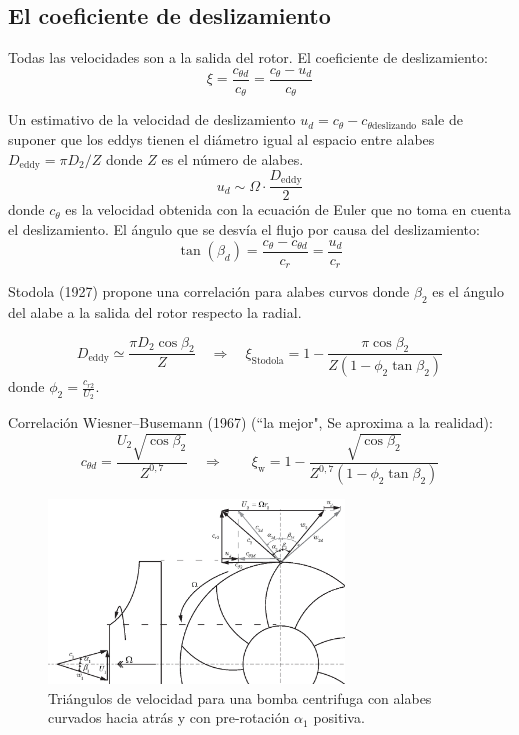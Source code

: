 \documentclass{article}
\newcommand{\ctan}[1]{\ensuremath{c_{\theta #1}}}
\newcommand{\crad}[1]{\ensuremath{c_{r #1}}}
\newcommand{\slip}{\xi}
\begin{document}
\subsection{El coeficiente de deslizamiento}
Todas las velocidades son a la salida del rotor. El coeficiente de deslizamiento:
\[
\slip = \frac{\ctan{d}}{\ctan{}} = \frac{\ctan{}-u_d}{\ctan{}}
\]

Un estimativo de la velocidad de deslizamiento $u_d= \ctan{}-\ctan{\mathrm{deslizando}}$ sale de suponer que los eddys tienen el diámetro igual al espacio entre alabes $D_{\mathrm{eddy}}= \pi D_{\mathrm{2}}/Z$ donde $Z$ es el número de alabes. 
\[
u_d \sim \Omega \cdot \frac{D_{\mathrm{eddy}}}{2}
\]
donde $\ctan{}$ es la velocidad obtenida con la ecuación de Euler que no toma en cuenta el deslizamiento. El ángulo que se desvía el flujo por causa del deslizamiento:
\[
\tan (\beta_d) =\frac{\ctan{}-\ctan{d}}{\crad{}}= \frac{u_d}{\crad{}}
\]

Stodola (1927) propone una correlación para alabes curvos donde $\beta_2$ es el ángulo del alabe a la salida del rotor respecto la radial.

\[
D_{\mathrm{eddy}}\simeq \frac{\pi D_2\cos \beta_2}{Z} \quad\Rightarrow \quad \slip_{\mathrm{Stodola}} = 1-\frac{\pi \cos \beta_2}{Z(1-\phi_2 \tan \beta_2)}
\]
donde $\phi_2 =\frac{\crad{2}}{U_2}$.

Correlación Wiesner--Busemann (1967) (``la mejor", Se aproxima a la realidad):
\[
\ctan{d} =\frac{U_2\sqrt{\cos \beta_2}}{Z^{0,7}}
\quad\Rightarrow\qquad
\slip_{\mathrm{w}} = 1 - \frac{\sqrt{\cos \beta_2}}{Z^{0,7}(1-\phi_2\tan \beta_2)}
\]

\begin{figure}[htb!]
    \centering
    \includegraphics[width=0.7\textwidth]{fig/centrifugoVelocityTriangle.eps}
    \caption{Triángulos de velocidad para una bomba centrifuga con alabes curvados hacia atrás y con pre-rotación $\alpha_1$ positiva. }
    \label{fig:my_label}
\end{figure}
\end{document}
